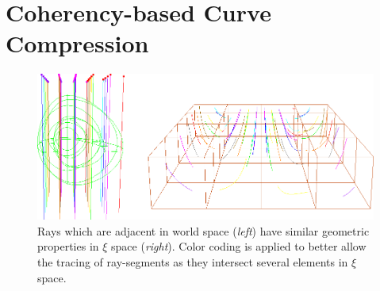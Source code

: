 \documentclass[review,journal]{vgtc}         %
\begin{document}
\section{Coherency-based Curve Compression}\label{sec:preprocessing}

\begin{figure}[t]
    \centering
    \includegraphics[width=0.95\linewidth]{figures/fem-crosscut.png}
    \caption{Rays which are adjacent in world space ({\it left}) have similar geometric properties in $\xi$ space ({\it right}). Color coding is applied to better allow the tracing of ray-segments as they intersect several elements in $\xi$ space.}
    \label{fig:coherency}
\end{figure}
\end{document}
